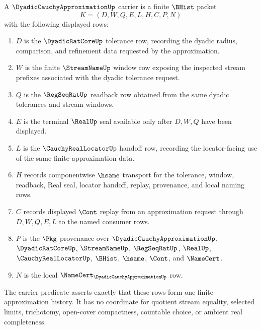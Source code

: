 \begin{definition}
\label{def:dyadic-cauchy-approximation-carrier}
A $\DyadicCauchyApproximationUp$ carrier is a finite $\BHist$ packet
$$
K=(D,W,Q,E,L,H,C,P,N)
$$
with the following displayed rows:
\begin{enumerate}
\item $D$ is the $\DyadicRatCoreUp$ tolerance row, recording the dyadic radius, comparison, and refinement data requested by the approximation.
\item $W$ is the finite $\StreamNameUp$ window row exposing the inspected stream prefixes associated with the dyadic tolerance request.
\item $Q$ is the $\RegSeqRatUp$ readback row obtained from the same dyadic tolerances and stream windows.
\item $E$ is the terminal $\RealUp$ seal available only after $D,W,Q$ have been displayed.
\item $L$ is the $\CauchyRealLocatorUp$ handoff row, recording the locator-facing use of the same finite approximation data.
\item $H$ records componentwise $\hsame$ transport for the tolerance, window, readback, Real seal, locator handoff, replay, provenance, and local naming rows.
\item $C$ records displayed $\Cont$ replay from an approximation request through $D,W,Q,E,L$ to the named consumer rows.
\item $P$ is the $\Pkg$ provenance over $\DyadicCauchyApproximationUp$, $\DyadicRatCoreUp$, $\StreamNameUp$, $\RegSeqRatUp$, $\RealUp$, $\CauchyRealLocatorUp$, $\BHist$, $\hsame$, $\Cont$, and $\NameCert$.
\item $N$ is the local $\NameCert_{\DyadicCauchyApproximationUp}$ row.
\end{enumerate}
The carrier predicate asserts exactly that these rows form one finite approximation history. It has no coordinate for quotient stream equality, selected limits, trichotomy, open-cover compactness, countable choice, or ambient real completeness.
\end{definition}

